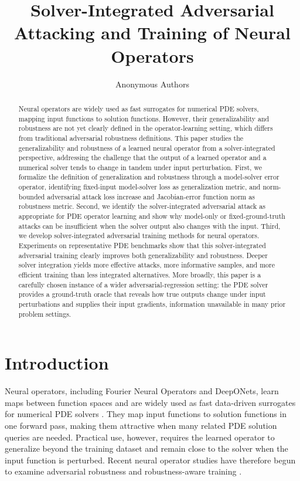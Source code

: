 ﻿\documentclass[letterpaper]{article} %
\title{Solver-Integrated Adversarial Attacking and Training of Neural Operators}
\author{Anonymous Authors}
\begin{document}
\maketitle
\begin{abstract}
Neural operators are widely used as fast surrogates for numerical PDE
solvers, mapping input functions to solution functions. However, their
generalizability and robustness are not yet clearly defined in the
operator-learning setting, which differs from traditional adversarial robustness
definitions. This paper studies the generalizability and robustness of a
learned neural operator from a solver-integrated perspective, addressing the
challenge that the output of a learned operator and a numerical solver tends to
change in tandem under input perturbation. First, we formalize the definition
of generalization and robustness through a model-solver error operator,
identifying fixed-input model-solver loss as generalization metric, and
norm-bounded adversarial attack loss increase and Jacobian-error function norm as
robustness metric. Second, we
identify the solver-integrated adversarial attack as appropriate
for PDE operator learning and show why model-only or fixed-ground-truth attacks
can be insufficient when the solver output also changes with the input. Third, we
develop solver-integrated adversarial training methods for neural operators.
Experiments on representative PDE benchmarks show that this solver-integrated
adversarial training clearly improves both generalizability and robustness.
Deeper solver integration yields more effective attacks, more informative
samples, and more efficient training than less integrated alternatives. More
broadly, this paper is a carefully chosen instance of a wider
adversarial-regression setting: the PDE solver provides a ground-truth oracle
that reveals how true outputs change under input perturbations and supplies
their input gradients, information unavailable in many prior problem settings.
\end{abstract}

\section{Introduction}

Neural operators, including Fourier Neural Operators and DeepONets, learn maps
between function spaces and are widely used as fast data-driven
surrogates for numerical PDE solvers \citep{li2021fourier,lu2021deeponet}.
They map input functions to solution functions in one forward pass, making them
attractive when many related PDE solution queries are needed. Practical use, however,
requires the learned operator to generalize beyond the training dataset and
remain close to the solver when the input function is perturbed. Recent neural
operator studies have therefore begun to examine adversarial robustness and
robustness-aware training
\citep{adesoji2022evaluating,huang2026stablepdenet,roy2026beyond}.
\end{document}
